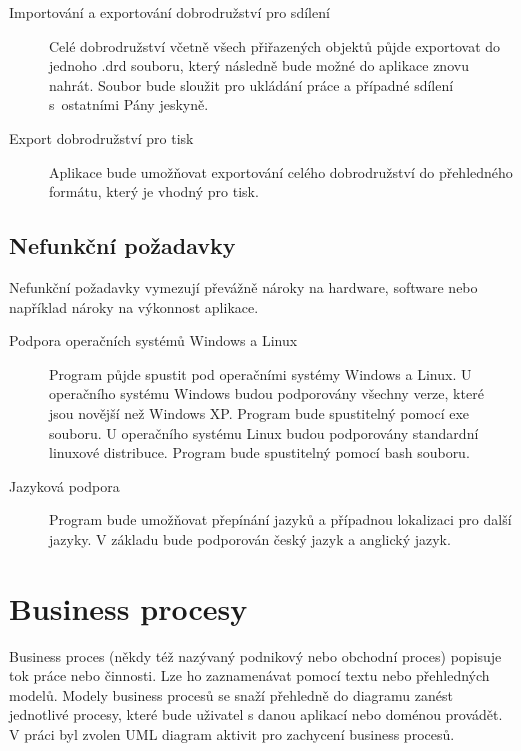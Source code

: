\documentclass[thesis=B,czech]{resources/FITthesis}[2012/06/26]
\begin{document}
\begin{description}
\item[Importování a exportování dobrodružství pro sdílení] Celé dobrodružství včetně všech přiřazených objektů půjde exportovat do jednoho .drd souboru, který následně bude možné do aplikace znovu nahrát. Soubor bude sloužit pro ukládání práce a případné sdílení s~ostatními Pány jeskyně.

\item[Export dobrodružství pro tisk] Aplikace bude umožňovat exportování celého dobrodružství do přehledného formátu, který je vhodný pro tisk. 
\end{description}

\subsection{Nefunkční požadavky}\label{sec:funkcni_pozadavky}
Nefunkční požadavky vymezují převážně nároky na hardware, software nebo například nároky na výkonnost aplikace. 
\begin{description}
\item[Podpora operačních systémů Windows a Linux] Program půjde spustit pod operačními systémy Windows a Linux. U operačního systému Windows budou podporovány všechny verze, které jsou novější než Windows XP. Program bude spustitelný pomocí exe souboru. U operačního systému Linux budou podporovány standardní linuxové distribuce. Program bude spustitelný pomocí bash souboru.

\item[Jazyková podpora] Program bude umožňovat přepínání jazyků a případnou lokalizaci pro další jazyky. V základu bude podporován český jazyk a anglický jazyk.
\end{description}
	\section{Business procesy}
Business proces (někdy též nazývaný podnikový nebo obchodní proces) popisuje tok práce nebo činnosti. Lze ho zaznamenávat pomocí textu nebo přehledných modelů. Modely business procesů se snaží přehledně do diagramu zanést jednotlivé procesy, které bude uživatel s danou aplikací nebo doménou provádět. V práci byl zvolen UML diagram aktivit pro zachycení business procesů.
\end{document}
